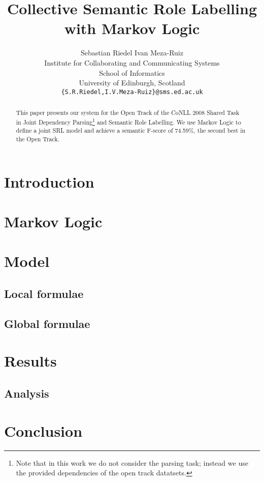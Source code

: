 \documentclass[11pt]{article}
\title{Collective Semantic Role Labelling with Markov Logic}
\author{Sebastian Riedel \qquad Ivan Meza-Ruiz\\
  Institute for Collaborating and Communicating Systems\\
  School of Informatics\\
  University of Edinburgh, Scotland\\
  {\tt\{S.R.Riedel,I.V.Meza-Ruiz\}@sms.ed.ac.uk} }
\date{}
\begin{document}
 


\maketitle
\begin{abstract}
  This paper presents our system for the Open Track of the CoNLL 2008 Shared Task~\citep{surdeanu08conll} in Joint Dependency Parsing\footnote{Note that in this work we do not consider the parsing task; instead we use the provided dependencies of the open track datatsets.} and Semantic Role Labelling. We use Markov Logic to define a joint SRL model and achieve a semantic F-score of 74.59\%, the second best in the Open Track.
\end{abstract}

\section{Introduction}



\section{Markov Logic} \label{sec:markovlogic}



\section{Model} \label{sec:model} 


\subsection{Local formulae}



\subsection{Global formulae}



\section{Results}\label{sec:results}


\subsection{Analysis}


\section{Conclusion} \label{sec:conclusion}





\end{document}
